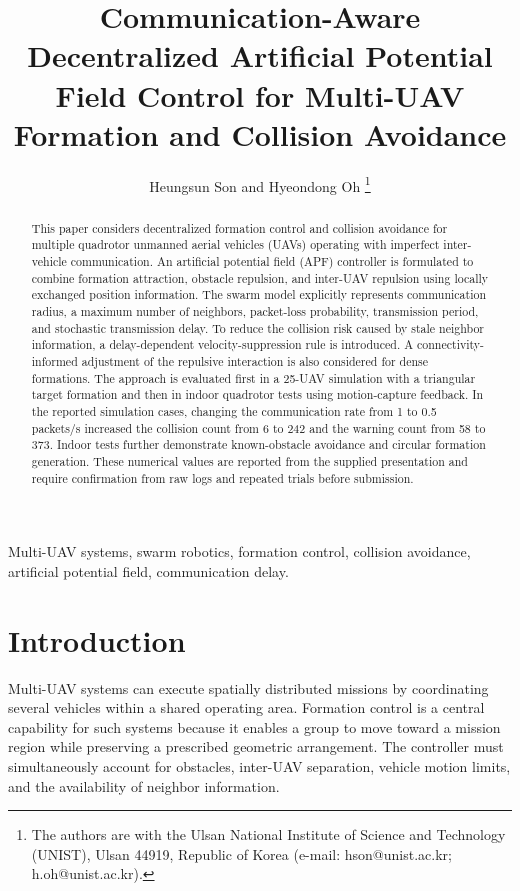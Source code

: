 \documentclass[journal]{IEEEtran}
\title{Communication-Aware Decentralized Artificial Potential Field Control for Multi-UAV Formation and Collision Avoidance}
\author{Heungsun Son and Hyeondong Oh%
\thanks{The authors are with the Ulsan National Institute of Science and Technology (UNIST), Ulsan 44919, Republic of Korea (e-mail: hson@unist.ac.kr; h.oh@unist.ac.kr).}%
}
\begin{document}
\maketitle

\begin{abstract}
This paper considers decentralized formation control and collision avoidance for multiple quadrotor unmanned aerial vehicles (UAVs) operating with imperfect inter-vehicle communication. An artificial potential field (APF) controller is formulated to combine formation attraction, obstacle repulsion, and inter-UAV repulsion using locally exchanged position information. The swarm model explicitly represents communication radius, a maximum number of neighbors, packet-loss probability, transmission period, and stochastic transmission delay. To reduce the collision risk caused by stale neighbor information, a delay-dependent velocity-suppression rule is introduced. A connectivity-informed adjustment of the repulsive interaction is also considered for dense formations. The approach is evaluated first in a 25-UAV simulation with a triangular target formation and then in indoor quadrotor tests using motion-capture feedback. In the reported simulation cases, changing the communication rate from 1 to 0.5 packets/s increased the collision count from 6 to 242 and the warning count from 58 to 373. Indoor tests further demonstrate known-obstacle avoidance and circular formation generation. These numerical values are reported from the supplied presentation and require confirmation from raw logs and repeated trials before submission.
\end{abstract}

\begin{IEEEkeywords}
Multi-UAV systems, swarm robotics, formation control, collision avoidance, artificial potential field, communication delay.
\end{IEEEkeywords}

\section{Introduction}
\label{sec:introduction}
Multi-UAV systems can execute spatially distributed missions by coordinating several vehicles within a shared operating area. Formation control is a central capability for such systems because it enables a group to move toward a mission region while preserving a prescribed geometric arrangement. The controller must simultaneously account for obstacles, inter-UAV separation, vehicle motion limits, and the availability of neighbor information.
\end{document}
